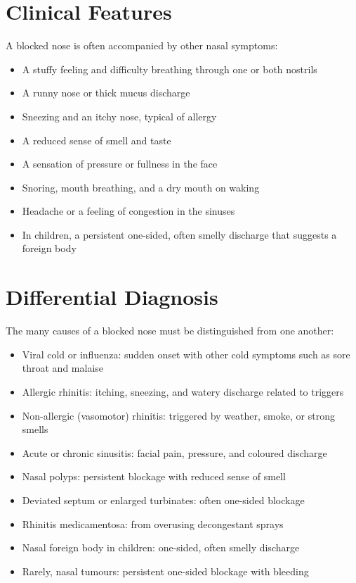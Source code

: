 \section*{Clinical Features}
A blocked nose is often accompanied by other nasal symptoms:

\begin{itemize}
    \item A stuffy feeling and difficulty breathing through one or both nostrils
    \item A runny nose or thick mucus discharge
    \item Sneezing and an itchy nose, typical of allergy
    \item A reduced sense of smell and taste
    \item A sensation of pressure or fullness in the face
    \item Snoring, mouth breathing, and a dry mouth on waking
    \item Headache or a feeling of congestion in the sinuses
    \item In children, a persistent one-sided, often smelly discharge that suggests a foreign body
\end{itemize}

\section*{Differential Diagnosis}
The many causes of a blocked nose must be distinguished from one another:

\begin{itemize}
    \item Viral cold or influenza: sudden onset with other cold symptoms such as sore throat and malaise
    \item Allergic rhinitis: itching, sneezing, and watery discharge related to triggers
    \item Non-allergic (vasomotor) rhinitis: triggered by weather, smoke, or strong smells
    \item Acute or chronic sinusitis: facial pain, pressure, and coloured discharge
    \item Nasal polyps: persistent blockage with reduced sense of smell
    \item Deviated septum or enlarged turbinates: often one-sided blockage
    \item Rhinitis medicamentosa: from overusing decongestant sprays
    \item Nasal foreign body in children: one-sided, often smelly discharge
    \item Rarely, nasal tumours: persistent one-sided blockage with bleeding
\end{itemize}

